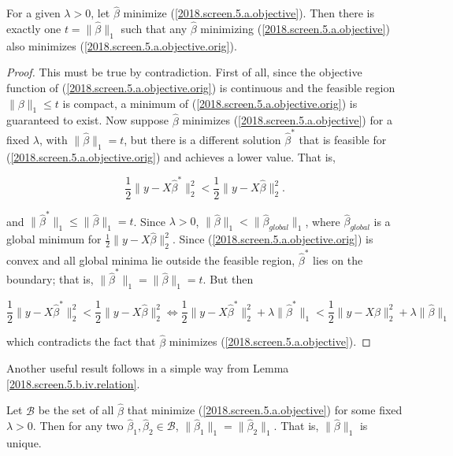 \begin{lemma}\label{2018.screen.5.b.iv.relation}
For a given \(\lambda >0\), let \(\hat{\beta}\) minimize (\ref{2018.screen.5.a.objective}). Then there is exactly one \(t = \lVert \hat{\beta} \rVert_1\) such that any \(\hat{\beta}\) minimizing (\ref{2018.screen.5.a.objective}) also minimizes (\ref{2018.screen.5.a.objective.orig}).

\end{lemma}

\begin{proof}
This must be true by contradiction. First of all, since the objective function of (\ref{2018.screen.5.a.objective.orig}) is continuous and the feasible region \(\lVert \beta \rVert_1 \leq t\) is compact, a minimum of (\ref{2018.screen.5.a.objective.orig}) is guaranteed to exist. Now suppose \(\hat{\beta}\) minimizes (\ref{2018.screen.5.a.objective}) for a fixed \(\lambda\), with \(\lVert \hat{\beta} \rVert_1 = t\), but there is a different solution \(\hat{\beta}^*\) that is feasible for (\ref{2018.screen.5.a.objective.orig}) and achieves a lower value. That is,

\[
\frac{1}{2} \lVert y - X \hat{\beta}^* \rVert_2^2  < \frac{1}{2} \lVert y - X \hat{\beta} \rVert_2^2.
\]

and \(\lVert\hat{\beta}^*\rVert_1 \leq \lVert\hat{\beta}\rVert_1 = t\). Since \(\lambda > 0\), \(\lVert\hat{\beta}\rVert_1 < \lVert \hat{\beta}_{global} \rVert_1\), where \(\hat{\beta}_{global}\) is a global minimum for \(\frac{1}{2} \lVert y - X \hat{\beta} \rVert_2^2\). Since (\ref{2018.screen.5.a.objective.orig}) is convex and all global minima lie outside the feasible region, \(\hat{\beta}^*\) lies on the boundary; that is, \(\lVert \hat{\beta}^* \rVert_1 = \lVert\hat{\beta}\rVert_1 = t\). But then

\[
\frac{1}{2} \lVert y - X \hat{\beta}^* \rVert_2^2  < \frac{1}{2} \lVert y - X \hat{\beta} \rVert_2^2 \iff \frac{1}{2} \lVert y - X \hat{\beta}^* \rVert_2^2 + \lambda \lVert\hat{\beta}^* \rVert_1 < \frac{1}{2} \lVert y - X \hat{\beta} \rVert_2^2 +  \lambda \lVert\hat{\beta} \rVert_1
\]

which contradicts the fact that \(\hat{\beta}\) minimizes (\ref{2018.screen.5.a.objective}). 

\end{proof}

Another useful result follows in a simple way from Lemma \ref{2018.screen.5.b.iv.relation}.

\begin{proposition}\label{linreg.2018.screen.5.b.iv.prop}
Let \(\mathcal{B}\) be the set of all \(\hat{\beta}\) that minimize (\ref{2018.screen.5.a.objective}) for some fixed \(\lambda > 0\). Then for any two \(\hat{\beta}_1, \hat{\beta}_2 \in \mathcal{B}\), \(\lVert \hat{\beta}_1 \rVert_1 = \lVert \hat{\beta}_2 \rVert_1\). That is, \(\lVert \hat{\beta} \rVert_1\) is unique.
\end{proposition}

